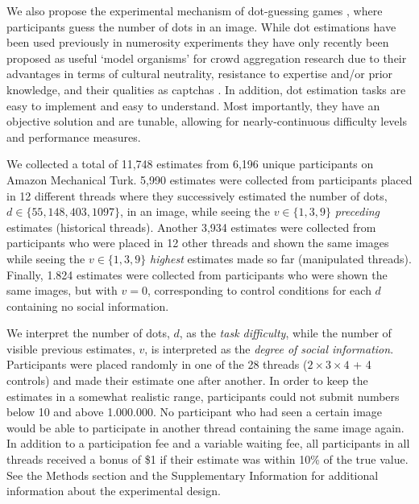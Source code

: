\documentclass[9pt,a4paper,twocolumn,lineno]{article}
\begin{document}
We also propose the experimental mechanism of dot-guessing games \cite{horton2010dot}, where participants guess the number of dots in an image. While dot estimations have been used previously in numerosity experiments \cite{minturn1951effect, indow1977scaling, krueger1982single} they have only recently been proposed as useful ‘model organisms’ for crowd aggregation research \cite{horton2010dot, ugander2015wisdom} due to their advantages in terms of cultural neutrality, resistance to expertise and/or prior knowledge, and their qualities as captchas \cite{von2008recaptcha}. In addition, dot estimation tasks are easy to implement and easy to understand. Most importantly, they have an objective solution and are tunable, allowing for nearly-continuous difficulty levels and performance measures.



We collected a total of 11,748 estimates from 6,196 unique participants on Amazon Mechanical Turk. 5,990 estimates were collected from participants placed in 12 different threads where they successively estimated the number of dots, $d \in \{55,148,403,1097\}$, in an image, while seeing the $v \in \{1,3,9\}$ \textit{preceding} estimates (historical threads). Another 3,934 estimates were collected from participants who were placed in 12 other threads and shown the same images while seeing the $v \in \{1,3,9\}$ \textit{highest} estimates made so far (manipulated threads). Finally, 1.824 estimates were collected from participants who were shown the same images, but with $v=0$, corresponding to control conditions for each $d$ containing no social information. 

We interpret the number of dots, $d$, as the \textit{task difficulty}, while the number of visible previous estimates, $v$, is interpreted as the \textit{degree of social information}. Participants were placed randomly in one of the 28 threads ($2 \times 3 \times 4$ + 4 controls)  and made their estimate one after another. In order to keep the estimates in a somewhat realistic range, participants could not submit numbers below 10 and above 1.000.000. No participant who had seen a certain image would be able to participate in another thread containing the same image again. In addition to a participation fee and a variable waiting fee, all participants in all threads received a bonus of \$1 if their estimate was within 10\% of the true value. See the Methods section and the Supplementary Information for additional information about the experimental design.
\end{document}
